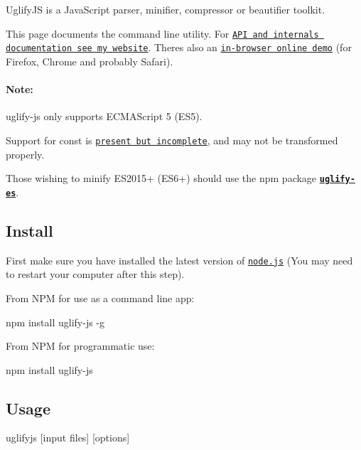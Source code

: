 \href{https://travis-ci.org/mishoo/UglifyJS2}{\tt }

Uglify\+JS is a Java\+Script parser, minifier, compressor or beautifier toolkit.

This page documents the command line utility. For \href{http://lisperator.net/uglifyjs/}{\tt A\+PI and internals documentation see my website}. There\textquotesingle{}s also an \href{http://lisperator.net/uglifyjs/#demo}{\tt in-\/browser online demo} (for Firefox, Chrome and probably Safari).

\paragraph*{Note\+:}


\begin{DoxyItemize}
\item {\ttfamily uglify-\/js} only supports E\+C\+M\+A\+Script 5 (E\+S5).
\item Support for {\ttfamily const} is \href{#support-for-const}{\tt present but incomplete}, and may not be transformed properly.
\item Those wishing to minify E\+S2015+ (E\+S6+) should use the {\ttfamily npm} package \href{https://github.com/mishoo/UglifyJS2/tree/harmony}{\tt {\bfseries uglify-\/es}}.
\end{DoxyItemize}

\subsection*{Install }

First make sure you have installed the latest version of \href{http://nodejs.org/}{\tt node.\+js} (You may need to restart your computer after this step).

From N\+PM for use as a command line app\+: \begin{DoxyVerb}npm install uglify-js -g
\end{DoxyVerb}


From N\+PM for programmatic use\+: \begin{DoxyVerb}npm install uglify-js
\end{DoxyVerb}


\subsection*{Usage }

\begin{DoxyVerb}uglifyjs [input files] [options]
\end{DoxyVerb}


